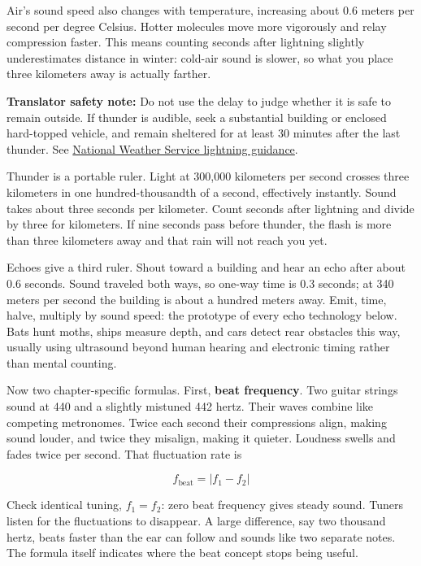 \begin{mainline}
Air's sound speed also changes with temperature, increasing about 0.6 meters per second per degree Celsius. Hotter molecules move more vigorously and relay compression faster. This means counting seconds after lightning slightly underestimates distance in winter: cold-air sound is slower, so what you place three kilometers away is actually farther.

\textbf{Translator safety note:} Do not use the delay to judge whether it is safe to remain outside. If thunder is audible, seek a substantial building or enclosed hard-topped vehicle, and remain sheltered for at least 30 minutes after the last thunder. See \href{https://www.weather.gov/safety/lightning-tips}{National Weather Service lightning guidance}.

Thunder is a portable ruler. Light at 300,000 kilometers per second crosses three kilometers in one hundred-thousandth of a second, effectively instantly. Sound takes about three seconds per kilometer. Count seconds after lightning and divide by three for kilometers. If nine seconds pass before thunder, the flash is more than three kilometers away and that rain will not reach you yet.

Echoes give a third ruler. Shout toward a building and hear an echo after about 0.6 seconds. Sound traveled both ways, so one-way time is 0.3 seconds; at 340 meters per second the building is about a hundred meters away. Emit, time, halve, multiply by sound speed: the prototype of every echo technology below. Bats hunt moths, ships measure depth, and cars detect rear obstacles this way, usually using ultrasound beyond human hearing and electronic timing rather than mental counting.

Now two chapter-specific formulas. First, \textbf{beat frequency}. Two guitar strings sound at 440 and a slightly mistuned 442 hertz. Their waves combine like competing metronomes. Twice each second their compressions align, making sound louder, and twice they misalign, making it quieter. Loudness swells and fades twice per second. That fluctuation rate is

\[
  f_{\text{beat}} = \lvert f_1 - f_2 \rvert
\]

Check identical tuning, \(f_1=f_2\): zero beat frequency gives steady sound. Tuners listen for the fluctuations to disappear. A large difference, say two thousand hertz, beats faster than the ear can follow and sounds like two separate notes. The formula itself indicates where the beat concept stops being useful.


\end{mainline}
